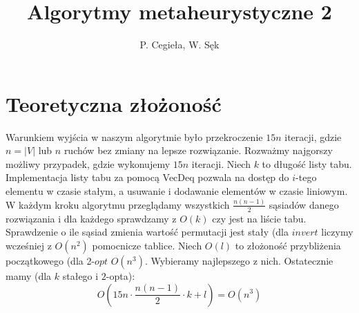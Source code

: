 \documentclass{article}
\title{Algorytmy metaheurystyczne 2}
\author{P. Cegieła, W. Sęk}
\begin{document}
 

\maketitle

\section{Teoretyczna złożoność}
Warunkiem wyjścia w naszym algorytmie było przekroczenie $15n$ iteracji, gdzie $n=|V|$ lub $n$ ruchów bez zmiany na lepsze rozwiązanie. Rozważmy najgorszy możliwy przypadek, gdzie wykonujemy $15n$ iteracji. Niech $k$ to długość listy tabu. Implementacja listy tabu za pomocą VecDeq pozwala na dostęp do $i$-tego elementu w czasie stałym, a usuwanie i dodawanie elementów w czasie liniowym.
\\
W każdym kroku algorytmu przeglądamy wszystkich $\frac{n(n-1)}{2}$ sąsiadów danego rozwiązania i dla każdego sprawdzamy z $O(k)$ czy jest na liście tabu. Sprawdzenie o ile sąsiad zmienia wartość permutacji jest stały (dla $invert$ liczymy wcześniej z $O(n^2)$ pomocnicze tablice. Niech $O(l)$ to złożoność przybliżenia początkowego (dla 
2-$opt$ $O(n^3)$. Wybieramy najlepszego z nich. Ostatecznie mamy (dla $k$ stałego i  $2$-opta):
$$O\left(15n\cdot \frac{n(n-1)}{2} \cdot k + l\right)=O(n^3)$$
\end{document}
